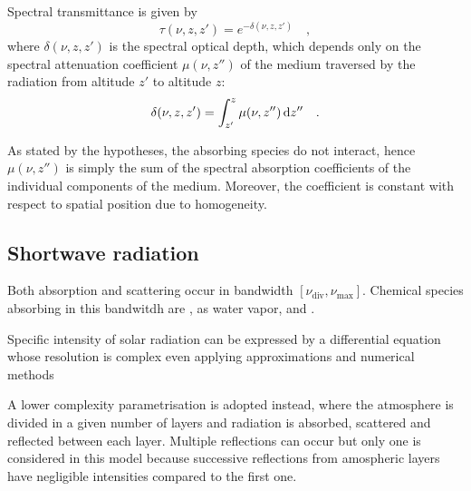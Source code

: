 \documentclass[a4paper,10pt,twocolumn,\classoptions]{article}
\begin{document}
Spectral transmittance is given by 
\begin{equation}
  \label{eq:spectral_transmittance}
  \tau(\nu, z, z') = e^{-\delta(\nu, z, z')}
  \quad ,
\end{equation}
where $\delta(\nu, z, z')$ is the spectral optical depth, which depends only on the spectral attenuation coefficient $\mu(\nu, z'')$ of the medium traversed by the radiation from altitude $z'$ to altitude $z$:
\begin{equation}
  \label{eq:spectral_optical_thickness}
  \delta(\nu, z, z') = \int_{z'}^{z} \mu(\nu, z'') \odif{z''}
  \quad .
\end{equation}

As stated by the hypotheses, the absorbing species do not interact, hence $\mu(\nu, z'')$ is simply the sum of the spectral absorption coefficients of the individual components of the medium. Moreover, the coefficient is constant with respect to spatial position due to homogeneity.



\subsection{Shortwave radiation}
\label{sec:Shortwave radiation}
Both absorption and scattering occur in bandwidth $[\nu_\text{div}, \nu_\text{max}]$.
Chemical species absorbing in this bandwitdh are ,  as water vapor,  and .



Specific intensity of solar radiation can be expressed by a differential equation whose resolution is complex even applying approximations and numerical methods

A lower complexity parametrisation is adopted instead, where the atmosphere is divided in a given number of layers and radiation is absorbed, scattered and reflected between each layer. Multiple reflections can occur but only one is considered in this model because successive reflections from amospheric layers have negligible intensities compared to the first one.

\end{document}
